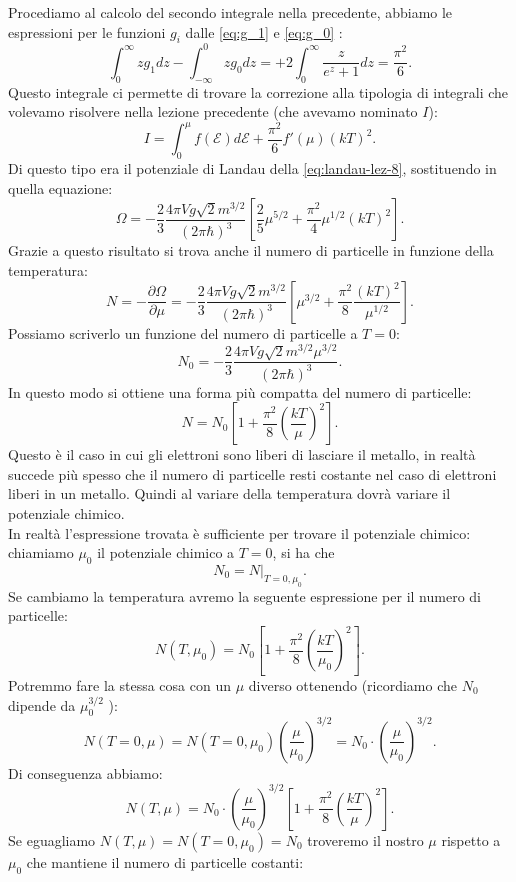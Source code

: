 Procediamo al calcolo del secondo integrale nella precedente, abbiamo le espressioni per le funzioni $g_{i}$ dalle \ref{eq:g_1} e \ref{eq:g_0} :
\[
	\int_{0}^{\infty} zg_1 dz - \int_{-\infty}^{0} zg_0 dz = + 2\int_{0}^{\infty} \frac{z}{e^{z}+1} dz = \frac{\pi^2}{6}
.\] 
Questo integrale ci permette di trovare la correzione alla tipologia di integrali che volevamo risolvere nella lezione precedente (che avevamo nominato $I$):
\[
	I = \int_{0}^{\mu } f( \mathcal{E} ) d\mathcal{E} + \frac{\pi^2}{6}f'( \mu ) \left( kT \right) ^2 
.\] 
Di questo tipo era il potenziale di Landau della \ref{eq:landau-lez-8}, sostituendo in quella equazione:
\[
	\Omega = - \frac{2}{3}\frac{4\pi V g \sqrt{2} m ^{3 /2}}{\left( 2\pi \hbar \right)^3 }
	\left[ \frac{2}{5}\mu ^{5 /2} + \frac{\pi^2}{4}\mu ^{1 /2} \left( kT \right) ^2 \right] 
.\] 
Grazie a questo risultato si trova anche il numero di particelle in funzione della temperatura:
\[
	N = - \frac{\partial \Omega }{\partial \mu }  = - \frac{2}{3}\frac{4\pi V g \sqrt{2} m ^{3 /2} }{\left( 2\pi \hbar \right)^3 }
	\left[ \mu ^{3 /2}+ \frac{\pi^2}{8} \frac{\left( kT \right)^2}{\mu ^{1 /2}} \right] 
.\] 
Possiamo scriverlo un funzione del numero di particelle a $T = 0$:
\[
	N_0 = - \frac{2}{3}\frac{4\pi V g \sqrt{2} m ^{3 /2}\mu ^{3 /2}}{\left( 2\pi \hbar \right)^3 }
.\] 
In questo modo si ottiene una forma più compatta del numero di particelle:
\[
	N = N_0 \left[ 1 + \frac{\pi^2}{8}\left( \frac{kT}{\mu } \right) ^2 \right] 
.\] 
Questo è il caso in cui gli elettroni sono liberi di lasciare il metallo, in realtà succede più spesso che il numero di particelle resti costante nel caso di elettroni liberi in un metallo. Quindi al variare della temperatura dovrà variare il potenziale chimico.\\
In realtà l'espressione trovata è sufficiente per trovare il potenziale chimico: chiamiamo $\mu_0$ il potenziale chimico a $T = 0$, si ha che
\[
	N_0 = \left.N\right|_{T=0, \mu_0}
.\] 
Se cambiamo la temperatura avremo la seguente espressione per il numero di particelle:
\[
	N( T, \mu_0)  = N_0\left[ 1 + \frac{\pi^2}{8}\left( \frac{kT}{\mu_0} \right)^2  \right] 
.\]
Potremmo fare la stessa cosa con un $\mu $ diverso ottenendo (ricordiamo che $N_0$ dipende da $\mu_0^{3 /2}$ ):
\[
	N( T = 0, \mu )  = N( T=0, \mu_0) \left( \frac{\mu}{\mu_0} \right) ^{3 /2} = N_0\cdot \left( \frac{\mu}{\mu_0} \right) ^{3 /2}
.\] 
Di conseguenza abbiamo:
\[
	N( T,\mu ) = N_0\cdot \left( \frac{\mu }{\mu_0} \right)^{3 /2} \left[ 1 + \frac{\pi^2}{8}\left( \frac{kT}{\mu } \right) ^2 \right] 
.\] 
Se eguagliamo $N( T, \mu ) = N( T=0, \mu_0) = N_0 $ troveremo il nostro $\mu $ rispetto a $\mu_0$ che mantiene il numero di particelle costanti:
